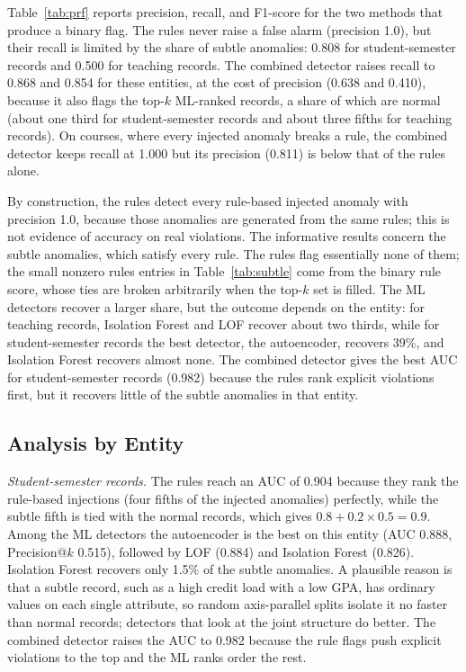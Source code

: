 \documentclass[conference]{IEEEtran}
\begin{document}
Table~\ref{tab:prf} reports precision, recall, and F1-score for the two methods that produce a binary flag. The rules never raise a false alarm (precision 1.0), but their recall is limited by the share of subtle anomalies: 0.808 for student-semester records and 0.500 for teaching records. The combined detector raises recall to 0.868 and 0.854 for these entities, at the cost of precision (0.638 and 0.410), because it also flags the top-$k$ ML-ranked records, a share of which are normal (about one third for student-semester records and about three fifths for teaching records). On courses, where every injected anomaly breaks a rule, the combined detector keeps recall at 1.000 but its precision (0.811) is below that of the rules alone.

By construction, the rules detect every rule-based injected anomaly with precision 1.0, because those anomalies are generated from the same rules; this is not evidence of accuracy on real violations. The informative results concern the subtle anomalies, which satisfy every rule. The rules flag essentially none of them; the small nonzero rules entries in Table~\ref{tab:subtle} come from the binary rule score, whose ties are broken arbitrarily when the top-$k$ set is filled. The ML detectors recover a larger share, but the outcome depends on the entity: for teaching records, Isolation Forest and LOF recover about two thirds, while for student-semester records the best detector, the autoencoder, recovers 39\%, and Isolation Forest recovers almost none. The combined detector gives the best AUC for student-semester records (0.982) because the rules rank explicit violations first, but it recovers little of the subtle anomalies in that entity.

\subsection{Analysis by Entity}
\textit{Student-semester records.} The rules reach an AUC of 0.904 because they rank the rule-based injections (four fifths of the injected anomalies) perfectly, while the subtle fifth is tied with the normal records, which gives $0.8+0.2\times0.5=0.9$. Among the ML detectors the autoencoder is the best on this entity (AUC 0.888, Precision@$k$ 0.515), followed by LOF (0.884) and Isolation Forest (0.826). Isolation Forest recovers only 1.5\% of the subtle anomalies. A plausible reason is that a subtle record, such as a high credit load with a low GPA, has ordinary values on each single attribute, so random axis-parallel splits isolate it no faster than normal records; detectors that look at the joint structure do better. The combined detector raises the AUC to 0.982 because the rule flags push explicit violations to the top and the ML ranks order the rest.
\end{document}
